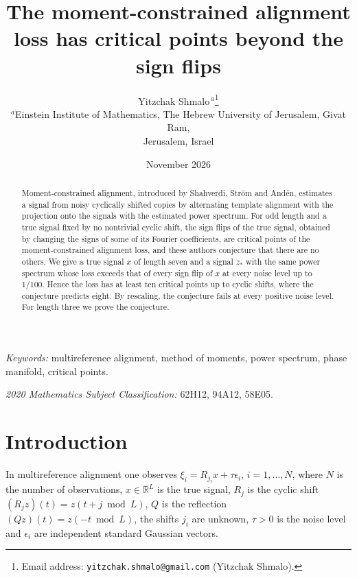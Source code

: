\documentclass[11pt]{article}
\title{The moment-constrained alignment loss has critical points beyond the sign flips}
\author{Yitzchak Shmalo$^{\,a}$\thanks{Email address:
\texttt{yitzchak.shmalo@gmail.com} (Yitzchak Shmalo).}\\
{\small $^{a}$Einstein Institute of Mathematics, The Hebrew University of
Jerusalem, Givat Ram,}\\
{\small Jerusalem, Israel}}
\date{November 2026}
\theoremstyle{remark}
\newcommand{\R}{\mathbb{R}}
\begin{document}
\maketitle

\begin{abstract}
Moment-constrained alignment, introduced by Shahverdi, Str\"om and And\'en, estimates a signal from noisy cyclically shifted copies by alternating template alignment with the projection onto the signals with the estimated power spectrum. For odd length and a true signal fixed by no nontrivial cyclic shift, the sign flips of the true signal, obtained by changing the signs of some of its Fourier coefficients, are critical points of the moment-constrained alignment loss, and these authors conjecture that there are no others. We give a true signal $x$ of length seven and a signal $z_*$ with the same power spectrum whose loss exceeds that of every sign flip of $x$ at every noise level up to $1/100$. Hence the loss has at least ten critical points up to cyclic shifts, where the conjecture predicts eight. By rescaling, the conjecture fails at every positive noise level. For length three we prove the conjecture.
\end{abstract}

\noindent\textit{Keywords:} multireference alignment, method of moments, power spectrum, phase manifold, critical points.

\noindent\textit{2020 Mathematics Subject Classification:} 62H12, 94A12, 58E05.

\section{Introduction}

In multireference alignment one observes $\xi_i=R_{j_i}x+\tau\epsilon_i$, $i=1,\dots,N$, where $N$ is the number of observations, $x\in\R^L$ is the true signal, $R_j$ is the cyclic shift $(R_jz)(t)=z(t+j\bmod L)$, $Q$ is the reflection $(Qz)(t)=z(-t\bmod L)$, the shifts $j_i$ are unknown, $\tau>0$ is the noise level and $\epsilon_i$ are independent standard Gaussian vectors.
\end{document}

